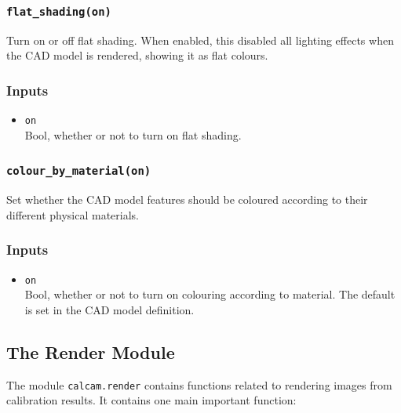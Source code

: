 \documentclass[12pt]{article}
\newcommand{\code}[1]{\texttt{#1}}
\begin{document}
\subsubsection*{\code{flat\_shading(on)}}
\begin{adjustwidth}{0.5cm}{0cm}
Turn on or off flat shading. When enabled, this disabled all lighting effects when the CAD model is rendered, showing it as flat colours.
\subsubsection*{Inputs}
\begin{itemize}
\item{\code{on}\\Bool, whether or not to turn on flat shading.}
\end{itemize}
\end{adjustwidth}
\subsubsection*{\code{colour\_by\_material(on)}}
\begin{adjustwidth}{0.5cm}{0cm}
Set whether the CAD model features should be coloured according to their different physical materials.
\subsubsection*{Inputs}
\begin{itemize}
\item{\code{on}\\Bool, whether or not to turn on colouring according to material. The default is set in the CAD model definition.}
\end{itemize}
\end{adjustwidth}

\subsection{The Render Module}
The module \code{calcam.render} contains functions related to rendering images from calibration results. It contains one main important function:
\end{document}
